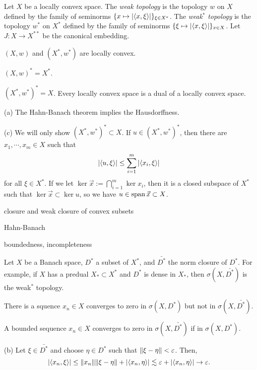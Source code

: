 \documentclass{../../large}
\begin{document}
\begin{prb}
Let $X$ be a locally convex space.
The \emph{weak topology} is the topology $w$ on $X$ defined by the family of seminorms $\{x\mapsto|\langle x,\xi\rangle|\}_{\xi\in X^*}$.
The \emph{weak$^*$ topology} is the topology $w^*$ on $X^*$ defined by the family of seminorms $\{\xi\mapsto|\langle x,\xi\rangle|\}_{x\in X}$.
Let $J:X\to X^{**}$ be the canonical embedding.
\begin{parts}
\item $(X,w)$ and $(X^*,w^*)$ are locally convex.
\item $(X,w)^*=X^*$.
\item $(X^*,w^*)^*=X$. Every locally convex space is a dual of a locally convex space.
\end{parts}
\end{prb}
\begin{pf}
(a)
The Hahn-Banach theorem implies the Hausdorffness.

(c)
We will only show $(X^*,w^*)^*\subset X$.
If $u\in(X^*,w^*)^*$, then there are $x_1,\cdots,x_m\in X$ such that
\[|\langle u,\xi\rangle|\le\sum_{i=1}^m|\langle x_i,\xi\rangle|\]
for all $\xi\in X^*$.
If we let $\ker\vec x:=\bigcap_{i=1}^m\ker x_i$, then it is a closed subspace of $X^*$ such that $\ker\vec x\subset\ker u$, so we have $u\in\operatorname{span}\vec x\subset X$.
\end{pf}

\begin{prb}
closure and weak closure of convex subsets
\end{prb}
\begin{pf}
Hahn-Banach
\end{pf}

\begin{prb}[Polar]
\end{prb}


boundedness, incompleteness

\begin{prb}
Let $X$ be a Banach space, $D^*$ a subset of $X^*$, and $\bar{D^*}$ the norm closure of $D^*$.
For example, if $X$ has a predual $X_*\subset X^*$ and $D^*$ is dense in $X_*$, then $\sigma(X,\bar{D^*})$ is the weak$^*$ topology.
\begin{parts}
\item There is a squence $x_n\in X$ converges to zero in $\sigma(X,D^*)$ but not in $\sigma(X,\bar{D^*})$.
\item A bounded sequence $x_n\in X$ converges to zero in $\sigma(X,\bar{D^*})$ if in $\sigma(X,D^*)$.
\end{parts}
\end{prb}
\begin{pf}
(b)
Let $\xi\in\bar{D^*}$ and choose $\eta\in D^*$ such that $\|\xi-\eta\|<\varepsilon$.
Then,
\[|\langle x_n,\xi\rangle|\le\|x_n\|\|\xi-\eta\|+|\langle x_n,\eta\rangle|\lesssim\varepsilon+|\langle x_n,\eta\rangle|\to\varepsilon.\]
\end{pf}
\end{document}
